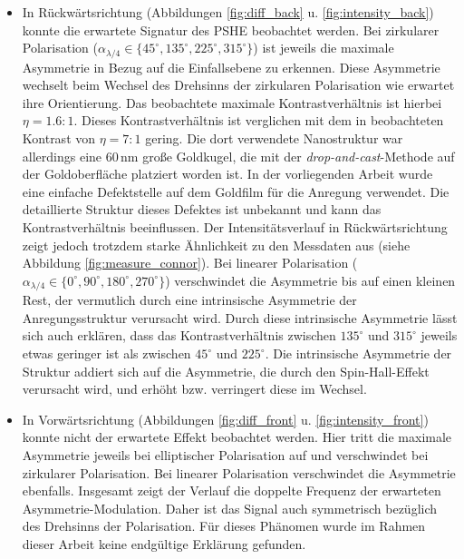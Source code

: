 \documentclass[titlepage,  ngerman]{article}
\begin{document}
		\begin{itemize}
			\item In Rückwärtsrichtung (Abbildungen \ref{fig:diff_back} u. \ref{fig:intensity_back}) konnte die erwartete Signatur des PSHE beobachtet werden. Bei zirkularer Polarisation ($\alpha_{\lambda/4} \in \{45^\circ, 135^\circ, 225^\circ, 315^\circ\}$) ist jeweils die maximale Asymmetrie in Bezug auf die Einfallsebene zu erkennen. Diese Asymmetrie wechselt beim Wechsel des Drehsinns der zirkularen Polarisation wie erwartet ihre Orientierung. Das beobachtete maximale Kontrastverhältnis ist hierbei $\eta = 1.6:1$. Dieses Kontrastverhältnis ist verglichen mit dem in \cite{OConnor.2014} beobachteten Kontrast von $\eta =7:1$ gering.  Die dort verwendete Nanostruktur war allerdings eine  $60\,\mathrm{nm}$ große Goldkugel, die mit der \textit{drop-and-cast}-Methode auf der Goldoberfläche platziert worden ist. In der vorliegenden Arbeit wurde eine einfache Defektstelle auf dem Goldfilm für die Anregung verwendet. Die detaillierte Struktur dieses Defektes ist unbekannt und kann das Kontrastverhältnis beeinflussen. Der Intensitätsverlauf in Rückwärtsrichtung zeigt jedoch trotzdem starke Ähnlichkeit zu den Messdaten aus \cite{OConnor.2014} (siehe Abbildung \ref{fig:measure_connor}). Bei linearer Polarisation ($\alpha_{\lambda/4} \in \{0^\circ, 90^\circ, 180^\circ, 270^\circ\}$) verschwindet die Asymmetrie bis auf einen kleinen Rest, der vermutlich durch eine intrinsische Asymmetrie der Anregungsstruktur verursacht wird. Durch diese intrinsische Asymmetrie lässt sich auch erklären, dass das Kontrastverhältnis zwischen $135^\circ$ und $ 315^\circ$ jeweils etwas geringer ist als zwischen $45^\circ$ und $225^\circ$.
			Die intrinsische Asymmetrie der Struktur addiert sich auf die Asymmetrie, die durch den Spin-Hall-Effekt verursacht wird, und erhöht bzw. verringert diese im Wechsel.
			\item In Vorwärtsrichtung (Abbildungen \ref{fig:diff_front} u. \ref{fig:intensity_front}) konnte nicht der erwartete Effekt beobachtet werden. Hier tritt die maximale Asymmetrie jeweils bei elliptischer Polarisation auf und verschwindet bei zirkularer Polarisation. Bei linearer Polarisation verschwindet die Asymmetrie ebenfalls. Insgesamt zeigt der Verlauf die doppelte Frequenz der erwarteten Asymmetrie-Modulation. Daher ist das Signal auch symmetrisch bezüglich des Drehsinns der Polarisation. Für dieses Phänomen wurde im Rahmen dieser Arbeit keine endgültige Erklärung gefunden.
			

\end{itemize}
\end{document}
